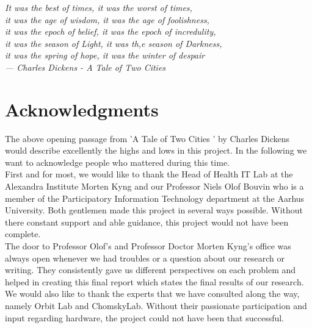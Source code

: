 
\begin{flushright}{\slshape    
	It was the best of times, it was the worst of times,\\
	it was the age of wisdom, it was the age of foolishness,\\ 
	it was the epoch of belief, it was the epoch of incredulity,\\ 
	it was the season of Light, it was th,e season of Darkness,\\
	it was the spring of hope, it was the winter of despair\\ \medskip
    --- Charles Dickens - A Tale of Two Cities \cite{dickens}}
\end{flushright}



\bigskip

\begingroup
\let\clearpage\relax
\let\cleardoublepage\relax
\let\cleardoublepage\relax
\chapter*{Acknowledgments}

The above opening passage from 'A Tale of Two  Cities ' by Charles Dickens would describe excellently the highs and lows in this project. In the following we want to acknowledge people who mattered during this time.\\

First and for most, we would like to thank the Head of Health IT Lab at the Alexandra Institute Morten Kyng and our Professor Niels Olof Bouvin who is a member of the Participatory Information Technology department at the Aarhus University. Both gentlemen made this project in several ways possible. Without there constant support and able guidance, this project would not have been complete.\\

The door to Professor Olof's and Professor Doctor Morten Kyng's office was always open whenever we had troubles or a question about our research or writing. They consistently gave us different perspectives on each problem and helped in creating this final report which states the final results of our research.\\

We would also like to thank the experts that we have consulted along the way, namely Orbit Lab and ChomskyLab. 
Without their passionate participation and input regarding hardware, the project could not have been that successful.
\endgroup




